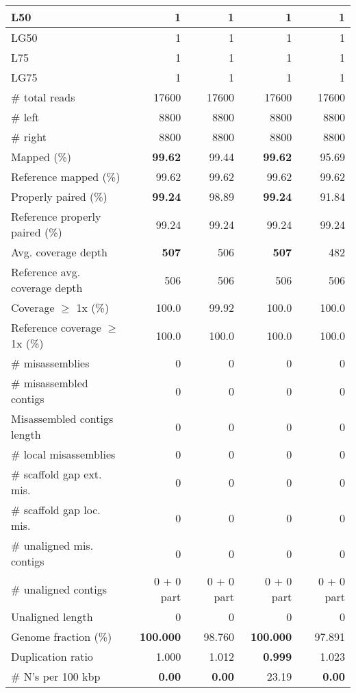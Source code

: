 \documentclass[12pt,a4paper]{article}
\begin{document}
\begin{table}[ht]
\begin{center}
\begin{tabular}{|l*{4}{|r}|}
L50 & 1 & 1 & 1 & 1 \\ \hline
LG50 & 1 & 1 & 1 & 1 \\ \hline
L75 & 1 & 1 & 1 & 1 \\ \hline
LG75 & 1 & 1 & 1 & 1 \\ \hline
\# total reads & 17600 & 17600 & 17600 & 17600 \\ \hline
\# left & 8800 & 8800 & 8800 & 8800 \\ \hline
\# right & 8800 & 8800 & 8800 & 8800 \\ \hline
Mapped (\%) & {\bf 99.62} & 99.44 & {\bf 99.62} & 95.69 \\ \hline
Reference mapped (\%) & 99.62 & 99.62 & 99.62 & 99.62 \\ \hline
Properly paired (\%) & {\bf 99.24} & 98.89 & {\bf 99.24} & 91.84 \\ \hline
Reference properly paired (\%) & 99.24 & 99.24 & 99.24 & 99.24 \\ \hline
Avg. coverage depth & {\bf 507} & 506 & {\bf 507} & 482 \\ \hline
Reference avg. coverage depth & 506 & 506 & 506 & 506 \\ \hline
Coverage $\geq$ 1x (\%) & 100.0 & 99.92 & 100.0 & 100.0 \\ \hline
Reference coverage $\geq$ 1x (\%) & 100.0 & 100.0 & 100.0 & 100.0 \\ \hline
\# misassemblies & 0 & 0 & 0 & 0 \\ \hline
\# misassembled contigs & 0 & 0 & 0 & 0 \\ \hline
Misassembled contigs length & 0 & 0 & 0 & 0 \\ \hline
\# local misassemblies & 0 & 0 & 0 & 0 \\ \hline
\# scaffold gap ext. mis. & 0 & 0 & 0 & 0 \\ \hline
\# scaffold gap loc. mis. & 0 & 0 & 0 & 0 \\ \hline
\# unaligned mis. contigs & 0 & 0 & 0 & 0 \\ \hline
\# unaligned contigs & 0 + 0 part & 0 + 0 part & 0 + 0 part & 0 + 0 part \\ \hline
Unaligned length & 0 & 0 & 0 & 0 \\ \hline
Genome fraction (\%) & {\bf 100.000} & 98.760 & {\bf 100.000} & 97.891 \\ \hline
Duplication ratio & 1.000 & 1.012 & {\bf 0.999} & 1.023 \\ \hline
\# N's per 100 kbp & {\bf 0.00} & {\bf 0.00} & 23.19 & {\bf 0.00} \\ \hline

\end{tabular}
\end{center}
\end{table}
\end{document}
